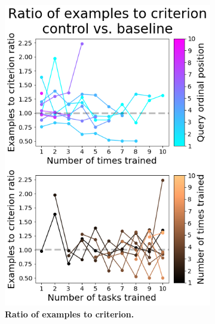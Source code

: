 \begin{figure}[!htb]
\centering
\begin{subfigure}{.49\textwidth}
  \centering
    \includegraphics[width=0.85\linewidth]{ch-results/figures/control_sequential/comparison_examples_to_criterion.png}
    \caption{ {\bf Ratio of examples to criterion.}}
    \label{fig:results-control-sequential-comparison-examples-to-criterion}
\end{subfigure}
\begin{subfigure}{.49\textwidth}
  \centering

\end{subfigure}
\end{figure}

